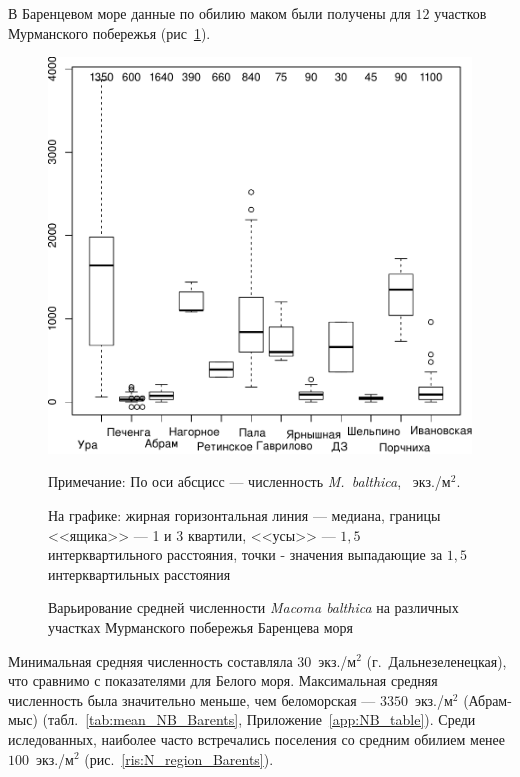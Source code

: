 В Баренцевом море данные по обилию маком были получены для $12$ участков Мурманского побережья (рис~\ref{ris:N_area_Barents}).
	\begin{figure}[hbp]
	\begin{center}
		\includegraphics[height=0.5\textheight]{../All_N/N2_area_Barents1.pdf}
	\end{center}
	\caption{Варьирование средней численности {\it Macoma balthica} на различных участках Мурманского побережья Баренцева моря}
	{\footnotesize Примечание: По оси абсцисс --- численность {\it M.~balthica}, ~экз./м$^2$.

	На графике: жирная горизонтальная линия --- медиана, границы <<ящика>> --- 1 и 3 квартили, <<усы>> --- $1,5$ интерквартильного расстояния, точки - значения выпадающие за $1,5$ интерквартильных расстояния}
	\label{ris:N_area_Barents}
	\end{figure}
Минимальная средняя численность составляла $30$~экз./м$^2$ (г.~Дальнезеленецкая), что сравнимо с показателями для Белого моря. 
Максимальная средняя численность была значительно меньше, чем беломорская --- $3350$~экз./м$^2$ (Абрам-мыс) (табл.~\ref{tab:mean_NB_Barents}, Приложение~\ref{app:NB_table}). 
Среди иследованных, наиболее часто встречались поселения со средним обилием менее $100$~экз./м$^2$ (рис.~\ref{ris:N_region_Barents}).

